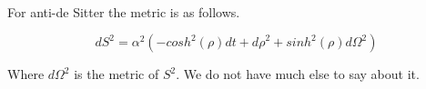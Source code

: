 \documentclass[10pt]{article}
\begin{document}
    \paragraph{} For anti-de Sitter the metric is as follows. 
    
    \begin{equation}
        {dS}^{2} = {\alpha}^{2}(-{cosh}^{2}(\rho)dt + {d\rho}^{2} + {sinh}^{2}(\rho){d\Omega}^{2})
    \end{equation}
    
\noindent Where ${d\Omega}^{2}$ is the metric of ${S}^{2}$. We do not have much else to say about it. 
\end{document}

